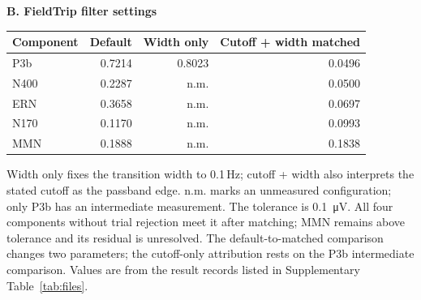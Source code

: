 \begin{table}[!htbp]
\par\medskip
\textbf{B. FieldTrip filter settings}\par\smallskip
\begin{tabular}{lrrr}
\toprule
Component & Default & Width only & Cutoff + width matched \\
\midrule
P3b & 0.7214 & 0.8023 & 0.0496 \\
N400 & 0.2287 & n.m. & 0.0500 \\
ERN & 0.3658 & n.m. & 0.0697 \\
N170 & 0.1170 & n.m. & 0.0993 \\
MMN & 0.1888 & n.m. & 0.1838 \\
\bottomrule
\end{tabular}
\par\smallskip
\begin{minipage}{\linewidth}\footnotesize
Width only fixes the transition width to 0.1\,Hz; cutoff + width also interprets the stated cutoff as the passband edge. n.m. marks an unmeasured configuration; only P3b has an intermediate measurement. The tolerance is \SI{0.1}{\uV}. All four components without trial rejection meet it after matching; MMN remains above tolerance and its residual is unresolved. The default-to-matched comparison changes two parameters; the cutoff-only attribution rests on the P3b intermediate comparison. Values are from the result records listed in Supplementary Table~\ref*{tab:files}.
\end{minipage}
\end{table}
